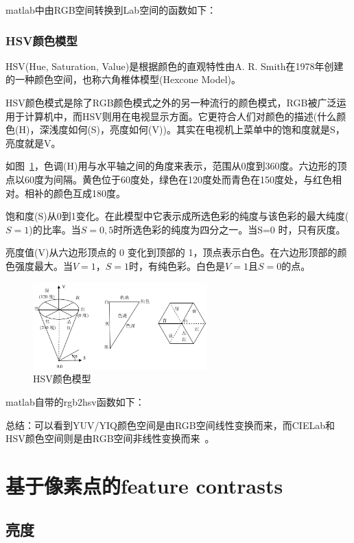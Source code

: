 \documentclass[12pt]{article}
\begin{document}
matlab中由RGB空间转换到Lab空间的函数如下：

\subsubsection{HSV颜色模型}

HSV(Hue, Saturation, Value)是根据颜色的直观特性由A. R. Smith在1978年创建的一种颜色空间，也称六角椎体模型(Hexcone Model)。

HSV颜色模式是除了RGB颜色模式之外的另一种流行的颜色模式，RGB被广泛运用于计算机中，而HSV则用在电视显示方面。它更符合人们对颜色的描述(什么颜色(H)，深浅度如何(S)，亮度如何(V))。其实在电视机上菜单中的饱和度就是S，亮度就是V。

如图~\ref{fig: HSV}，色调(H)用与水平轴之间的角度来表示，范围从0度到360度。六边形的顶点以60度为间隔。黄色位于60度处，绿色在120度处而青色在150度处，与红色相对。相补的颜色互成180度。

饱和度(S)从0到1变化。在此模型中它表示成所选色彩的纯度与该色彩的最大纯度($S=1$)的比率。当$S=0,5$时所选色彩的纯度为四分之一。当S=0 时，只有灰度。

亮度值(V)从六边形顶点的 0 变化到顶部的 1，顶点表示白色。在六边形顶部的颜色强度最大。当$ V=1$，$S=1$时，有纯色彩。白色是$V=1$且$S=0$的点。

\begin{figure}[!ht]
\centering
\includegraphics[width=0.6\textwidth]{HSV.jpg}
\caption{HSV颜色模型}
\label{fig: HSV}
\end{figure} 

matlab自带的rgb2hsv函数如下：
 

总结：可以看到YUV/YIQ颜色空间是由RGB空间线性变换而来，而CIELab和HSV颜色空间则是由RGB空间非线性变换而来~\cite{kim2014salient}。

\section{基于像素点的feature contrasts}

\subsection{亮度}
\end{document}
